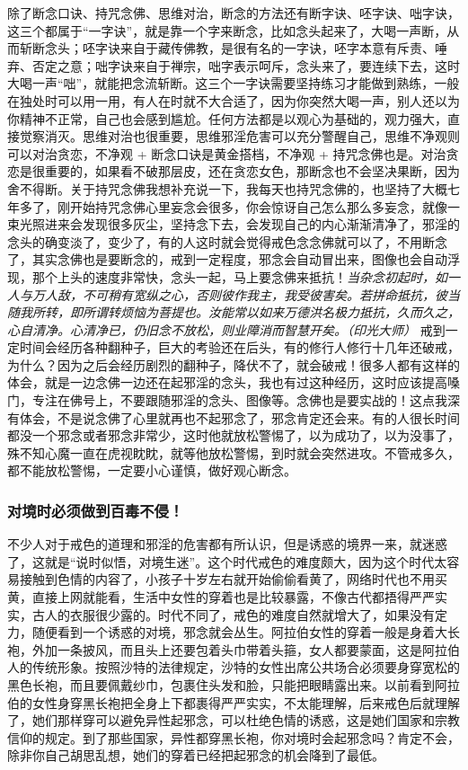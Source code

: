 除了断念口诀、持咒念佛、思维对治，断念的方法还有断字诀、呸字诀、咄字诀，这三个都属于“一字诀”，就是靠一个字来断念，比如念头起来了，大喝一声断，从而斩断念头；呸字诀来自于藏传佛教，是很有名的一字诀，呸字本意有斥责、唾弃、否定之意；咄字诀来自于禅宗，咄字表示呵斥，念头来了，要连续下去，这时大喝一声“咄”，就能把念流斩断。这三个一字诀需要坚持练习才能做到熟练，一般在独处时可以用一用，有人在时就不大合适了，因为你突然大喝一声，别人还以为你精神不正常，自己也会感到尴尬。任何方法都是以观心为基础的，观力强大，直接觉察消灭。思维对治也很重要，思维邪淫危害可以充分警醒自己，思维不净观则可以对治贪恋，不净观 + 断念口诀是黄金搭档，不净观 + 持咒念佛也是。对治贪恋是很重要的，如果看不破那层皮，还在贪恋女色，那断念也不会坚决果断，因为舍不得断。关于持咒念佛我想补充说一下，我每天也持咒念佛的，也坚持了大概七年多了，刚开始持咒念佛心里妄念会很多，你会惊讶自己怎么那么多妄念，就像一束光照进来会发现很多灰尘，坚持念下去，会发现自己的内心渐渐清净了，邪淫的念头的确变淡了，变少了，有的人这时就会觉得戒色念念佛就可以了，不用断念了，其实念佛也是要断念的，戒到一定程度，邪念会自动冒出来，图像也会自动浮现，那个上头的速度非常快，念头一起，马上要念佛来抵抗！\textit{当杂念初起时，如一人与万人敌，不可稍有宽纵之心，否则彼作我主，我受彼害矣。若拼命抵抗，彼当随我所转，即所谓转烦恼为菩提也。汝能常以如来万德洪名极力抵抗，久而久之，心自清净。心清净已，仍旧念不放松，则业障消而智慧开矣。（印光大师）} 戒到一定时间会经历各种翻种子，巨大的考验还在后头，有的修行人修行十几年还破戒，为什么？因为之后会经历剧烈的翻种子，降伏不了，就会破戒！很多人都有这样的体会，就是一边念佛一边还在起邪淫的念头，我也有过这种经历，这时应该提高嗓门，专注在佛号上，不要跟随邪淫的念头、图像等。念佛也是要实战的！这点我深有体会，不是说念佛了心里就再也不起邪念了，邪念肯定还会来。有的人很长时间都没一个邪念或者邪念非常少，这时他就放松警惕了，以为成功了，以为没事了，殊不知心魔一直在虎视眈眈，就等他放松警惕，到时就会突然进攻。不管戒多久，都不能放松警惕，一定要小心谨慎，做好观心断念。

\subsubsection{对境时必须做到百毒不侵！}

不少人对于戒色的道理和邪淫的危害都有所认识，但是诱惑的境界一来，就迷惑了，这就是“说时似悟，对境生迷”。这个时代戒色的难度颇大，因为这个时代太容易接触到色情的内容了，小孩子十岁左右就开始偷偷看黄了，网络时代也不用买黄，直接上网就能看，生活中女性的穿着也是比较暴露，不像古代都捂得严严实实，古人的衣服很少露的。时代不同了，戒色的难度自然就增大了，如果没有定力，随便看到一个诱惑的对境，邪念就会丛生。阿拉伯女性的穿着一般是身着大长袍，外加一条披风，而且头上还要包着头巾带着头箍，女人都要蒙面，这是阿拉伯人的传统形象。按照沙特的法律规定，沙特的女性出席公共场合必须要身穿宽松的黑色长袍，而且要佩戴纱巾，包裹住头发和脸，只能把眼睛露出来。以前看到阿拉伯的女性身穿黑长袍把全身上下都裹得严严实实，不太能理解，后来戒色后就理解了，她们那样穿可以避免异性起邪念，可以杜绝色情的诱惑，这是她们国家和宗教信仰的规定。到了那些国家，异性都穿黑长袍，你对境时会起邪念吗？肯定不会，除非你自己胡思乱想，她们的穿着已经把起邪念的机会降到了最低。

